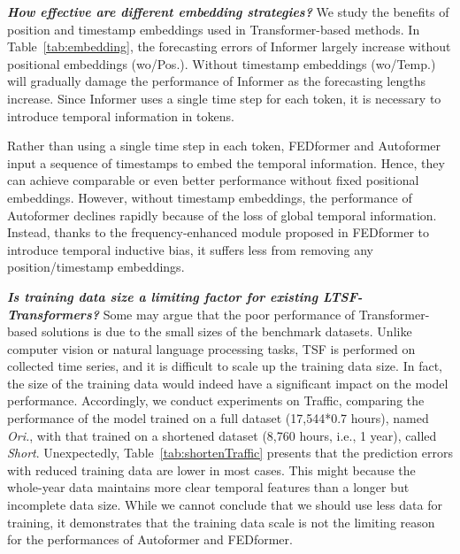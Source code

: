             

\textbf{\emph{How effective are different embedding strategies?}}
%
We study the benefits of position and timestamp embeddings used in Transformer-based methods. 
%
In Table~\ref{tab:embedding}, the forecasting errors of Informer largely increase without positional embeddings (wo/Pos.). Without timestamp embeddings (wo/Temp.) will gradually damage the performance of Informer as the forecasting lengths increase. 
%
Since Informer uses a single time step for each token, it is necessary to introduce temporal information in tokens.

%
Rather than using a single time step in each token, FEDformer and Autoformer input a sequence of timestamps to embed the temporal information. 
%
Hence, they can achieve comparable or even better performance without fixed positional embeddings. However, without timestamp embeddings, the performance of Autoformer declines rapidly because of the loss of global temporal information. Instead, thanks to the frequency-enhanced module proposed in FEDformer to introduce temporal inductive bias, it suffers less from removing any position/timestamp embeddings. 
%



\textbf{\emph{Is training data size a limiting factor for existing LTSF-Transformers?}}
Some may argue that the poor performance of Transformer-based solutions is due to the small sizes of the benchmark datasets. 
Unlike computer vision or natural language processing tasks, TSF is performed on collected time series, and it is difficult to scale up the training data size. In fact, the size of the training data would indeed have a significant impact on the model performance. Accordingly, we conduct experiments on Traffic, comparing the performance of the model trained on a full dataset (17,544*0.7 hours), named \emph{Ori.}, with that trained on a shortened dataset (8,760 hours, i.e., 1 year), called \emph{Short}. Unexpectedly, Table~\ref{tab:shortenTraffic} presents that the prediction errors with reduced training data are lower in most cases. This might because the whole-year data maintains more clear temporal features than a longer but incomplete data size. While we cannot conclude that we should use less data for training, it demonstrates that the training data scale is not the limiting reason for the performances of Autoformer and FEDformer. 


